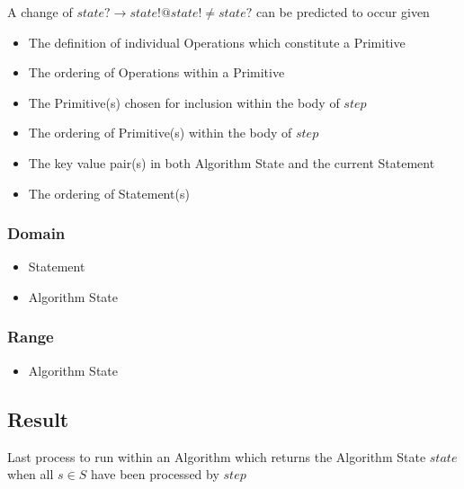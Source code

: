\documentclass[../main.tex]{subfiles}
\begin{document}
A change of $state? \to state! @ state! \not= state?$ can be predicted to occur given
\begin{itemize}
\item The definition of individual Operations which constitute a Primitive
\item The ordering of Operations within a Primitive
\item The Primitive(s) chosen for inclusion within the body of $step$
\item The ordering of Primitive(s) within the body of $step$
\item The key value pair(s) in both Algorithm State and the current Statement
\item The ordering of Statement(s)
\end{itemize}

\subsubsection{Domain}

\begin{itemize}
\item Statement
\item Algorithm State
\end{itemize}

\subsubsection{Range}

\begin{itemize}
\item Algorithm State
\end{itemize}

\subsection{Result}

Last process to run within an Algorithm which returns the Algorithm State $state$
when all $s \in S$ have been processed by $step$
\end{document}
